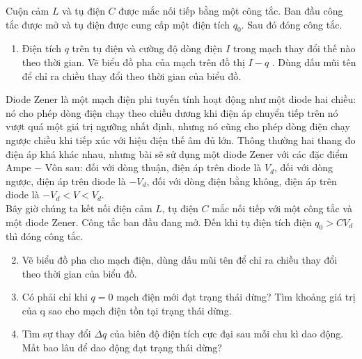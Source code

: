 \begin{vd}
    Cuộn cảm $L$ và tụ điện $C$ được mắc nối tiếp bằng một công tắc. Ban đầu công tắc được mở và tụ điện được cung cấp một điện tích $q_0$. Sau đó đóng công tắc.
    \begin{enumerate}[1)]
        \item Điện tích $q$ trên tụ điện và cường độ dòng điện $I$ trong mạch thay đổi thế nào theo thời gian. Vẽ biểu đồ pha của mạch trên đồ thị $I-q$ . Dùng dấu mũi tên để chỉ ra chiều thay đổi theo thời gian của biểu đồ.
    \end{enumerate}
    Diode Zener là một mạch điện phi tuyến tính hoạt động như một diode hai chiều: nó cho phép dòng điện chạy theo chiều dương khi điện áp chuyển tiếp trên nó vượt quá một giá trị ngưỡng nhất định, nhưng nó cũng cho phép dòng điện chạy ngược chiều khi tiếp xúc với hiệu điện thế âm đủ lớn. Thông thường hai thang đo điện áp khá khác nhau, nhưng bài sẽ sử dụng một diode Zener với các đặc điểm Ampe $-$ Vôn sau: đối với dòng thuận, điện áp trên diode là $V_d$, đối với dòng ngược, điện áp trên diode là $-V_d$, đối với dòng điện bằng không, điện áp trên diode là $-V_d <V <V_d$.
    \\Bây giờ chúng ta kết nối điện cảm $L$, tụ điện $C$ mắc nối tiếp với một công tắc và một diode Zener. Công tắc ban đầu đang mở. Đến khi tụ điện tích điện $q_0> CV_d$ thì đóng công tắc.
     \begin{enumerate}[1)]
        \setcounter{enumi}{1}
        \item Vẽ biểu đồ pha cho mạch điện, dùng dấu mũi tên để chỉ ra chiều thay đổi theo thời gian của biểu đồ.
        \item Có phải chỉ khi $q=0$ mạch điện mới đạt trạng thái dừng? Tìm khoảng giá trị của q sao cho mạch điện tồn tại trạng thái dừng.
        \item Tìm sự thay đổi $\Delta q$ của biên độ điện tích cực đại sau mỗi chu kì dao động. Mất bao lâu để dao động đạt trạng thái dừng?
    \end{enumerate}
\end{vd}
